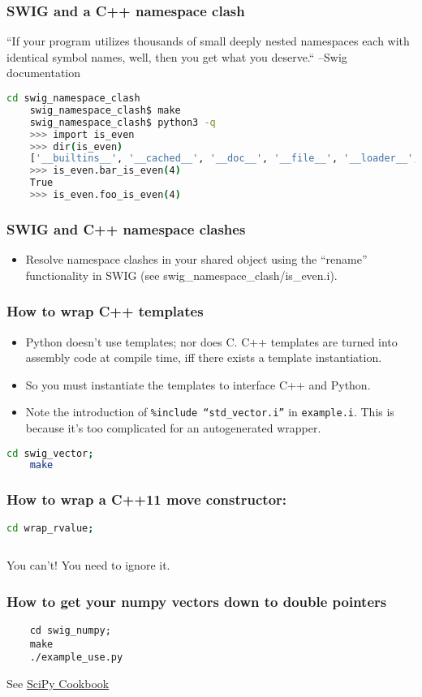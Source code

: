 \documentclass{beamer}
\begin{document}
\begin{frame}[fragile]
  \frametitle{SWIG and a C++ namespace clash}
  ``If your program utilizes thousands of small deeply nested namespaces each with identical symbol names, well, then
  you get what you deserve.`` --Swig documentation
  \begin{lstlisting}[language=bash]
    cd swig_namespace_clash
    swig_namespace_clash$ make
    swig_namespace_clash$ python3 -q
    >>> import is_even
    >>> dir(is_even)
    ['__builtins__', '__cached__', '__doc__', '__file__', '__loader__', '__name__', '__package__', '__spec__', '_is_even', '_newclass', '_object', '_swig_getattr', '_swig_getattr_nondynamic', '_swig_property', '_swig_repr', '_swig_setattr', '_swig_setattr_nondynamic', 'bar_is_even', 'foo_is_even']
    >>> is_even.bar_is_even(4)
    True
    >>> is_even.foo_is_even(4)
   \end{lstlisting}
\end{frame}

\begin{frame}[fragile]
  \frametitle{SWIG and C++ namespace clashes}
  \begin{itemize}
    \item Resolve namespace clashes in your shared object using the ``rename'' functionality in SWIG (see swig\_namespace\_clash/is\_even.i).
  \end{itemize}
\end{frame}

\begin{frame}[fragile]
  \frametitle{How to wrap C++ templates}

  \begin{itemize}
    \item Python doesn't use templates; nor does C. C++ templates are turned into assembly code at compile time, iff there exists a template instantiation.
    \item So you must instantiate the templates to interface C++ and Python.
      \item Note the introduction of \texttt{\%include ``std\_vector.i''} in \texttt{example.i}. This is because it's too complicated for an autogenerated wrapper.
        \end{itemize}
  \begin{lstlisting}[language=bash]
    cd swig_vector;
    make
  \end{lstlisting}

\end{frame}

\begin{frame}[fragile]
  \frametitle{How to wrap a C++11 move constructor:}
  \begin{lstlisting}[language=bash]
    cd wrap_rvalue;
    
  \end{lstlisting}

  You can't! You need to ignore it.
\end{frame}

\begin{frame}[fragile]
  \frametitle{How to get your numpy vectors down to double pointers}
  \begin{lstlisting}
    cd swig_numpy;
    make
    ./example_use.py
  \end{lstlisting}
  See \href{http://wiki.scipy.org/Cookbook/SWIG_NumPy_examples}{SciPy Cookbook}
\end{frame}
\end{document}
